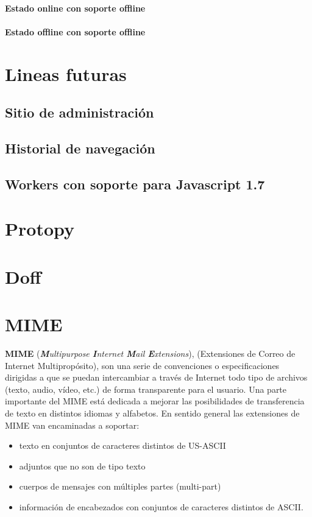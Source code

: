 \documentclass[a4paper]{report}
\begin{document}
\subsubsection{Estado online con soporte offline}
\subsubsection{Estado offline con soporte offline}

\chapter{Lineas futuras}
\section{Sitio de administración}
\section{Historial de navegación}
\section{Workers con soporte para Javascript 1.7}

\appendix
\chapter{Protopy}

\chapter{Doff}

\chapter{MIME}

\textbf{MIME} \label{mime}(\textit{\textbf{M}ultipurpose \textbf{I}nternet \textbf{M}ail \textbf{E}xtensions}), 
(Extensiones de Correo de Internet Multipropósito), son una serie de
convenciones o especificaciones dirigidas a que se puedan intercambiar a través
de Internet todo tipo de archivos (texto, audio, vídeo, etc.) de forma
transparente para el usuario. Una parte importante del MIME está dedicada a
mejorar las posibilidades de transferencia de texto en distintos idiomas y
alfabetos. En sentido general las extensiones de MIME van encaminadas a
soportar:
\begin{itemize}
 \item texto en conjuntos de caracteres distintos de US-ASCII
 \item adjuntos que no son de tipo texto
 \item cuerpos de mensajes con múltiples partes (multi-part)
 \item información de encabezados con conjuntos de caracteres distintos de ASCII.
\end{itemize}
\end{document}
